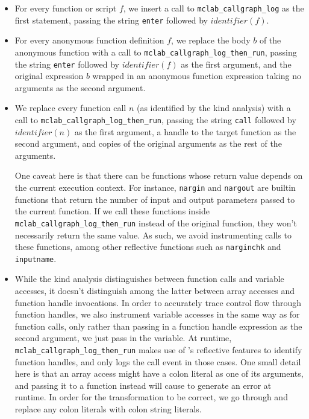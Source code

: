 \begin{itemize}

\item For every function or script $f$, we insert a call to
  \texttt{mclab\_callgraph\_log} as the first statement, passing the string
  \texttt{enter} followed by $identifier(f)$.

\item For every anonymous function definition $f$, we replace the body $b$ of the
  anonymous function with a call to \texttt{mclab\_callgraph\_log\_then\_run},
  passing the string \texttt{enter} followed by $identifier(f)$ as the first
  argument, and the original expression $b$ wrapped in an anonymous function
  expression taking no arguments as the second argument.

\item We replace every function call $n$ (as identified by the kind analysis)
  with a call to \texttt{mclab\_callgraph\_log\_then\_run}, passing the string
  \texttt{call} followed by $identifier(n)$ as the first argument, a handle to
  the target function as the second argument, and copies of the original
  arguments as the rest of the arguments.

  One caveat here is that there can be functions whose return value
  depends on the current execution context. For instance, \texttt{nargin} and
  \texttt{nargout} are builtin functions that return the number of input and
  output parameters passed to the current function. If we call these functions
  inside \texttt{mclab\_callgraph\_log\_then\_run} instead of the original
  function, they won't necessarily return the same value. As such, we avoid
  instrumenting calls to these functions, among other reflective functions such
  as \texttt{narginchk} and \texttt{inputname}.

\item While the kind analysis distinguishes between function calls and variable
  accesses, it doesn't distinguish among the latter between array accesses and
  function handle invocations. In order to accurately trace control flow through
  function handles, we also instrument variable accesses in the same way as for
  function calls, only rather than passing in a function handle expression as
  the second argument, we just pass in the variable. At runtime,
  \texttt{mclab\_callgraph\_log\_then\_run} makes use of \matlab's reflective
  features to identify function handles, and only logs the call event in those
  cases. One small detail here is that an array access might have a colon
  literal as one of its arguments, and passing it to a function instead will
  cause \matlab to generate an error at runtime. In order for the
  transformation to be correct, we go through and replace any colon literals
  with colon string literals.

\end{itemize}

